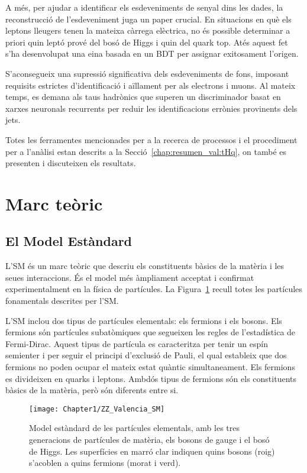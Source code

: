 A més, per ajudar a identificar els esdeveniments de senyal dins les dades, la reconstrucció de l'esdeveniment juga 
un paper crucial. En situacions en què els leptons lleugers tenen la mateixa càrrega elèctrica, no és possible 
determinar a priori quin leptó prové del bosó de Higgs i quin del quark $\text{top}$. Atés aquest fet s'ha 
desenvolupat una eina basada en un BDT per assignar exitosament l'origen. 

S'aconsegueix una supressió significativa dels esdeveniments de fons, imposant requisits estrictes d'identificació i aïllament 
per als electrons i muons. Al mateix temps, es demana als taus hadrònics que superen un discriminador basat en xarxes 
neuronals recurrents per reduir les identificacions errònies provinents dels jets.

Totes les ferramentes mencionades per a la recerca de processos \tH i el procediment per a l'anàlisi estan descrits a la 
Secció~\ref{chap:resumen_val:tHq}, on també es presenten i discuteixen els resultats.

\section{Marc teòric}
\label{chap:resumen_val:Teoria}

\subsection{El Model Estàndard}
L'SM és un marc teòric que descriu els constituents 
bàsics de la matèria i les seues interaccions. És el model més àmpliament acceptat i confirmat experimentalment 
en la física de partícules. La Figura~\ref{fig:resumen_val:Teoria:SM} recull totes les partícules fonamentals descrites per l'SM.

L'SM inclou dos tipus de partícules elementals: els fermions i els bosons.
Els fermions són partícules subatòmiques que segueixen les regles de l'estadística de Fermi-Dirac. 
Aquest tipus de partícula es caracteritza per tenir un espín semienter i per seguir el principi d'exclusió 
de Pauli, el qual estableix que dos fermions no poden ocupar el mateix estat quàntic simultaneament. 
Els fermions es divideixen en quarks i leptons. Ambdós tipus de fermions són els constituents bàsics 
de la matèria, però són diferents entre si.

\begin{figure}[h]
 	 \centering
 	  \texttt{[image: Chapter1/ZZ\_Valencia\_SM]}
	  \caption{Model estàndard de les partícules elementals, amb les tres generacions de partícules de 
	  matèria, els bosons de gauge i el bosó de Higgs. Les superfícies en marró clar indiquen quins 
	  bosons (roig) s'acoblen a quins fermions (morat i verd).} 
	\label{fig:resumen_val:Teoria:SM}
\end{figure}


